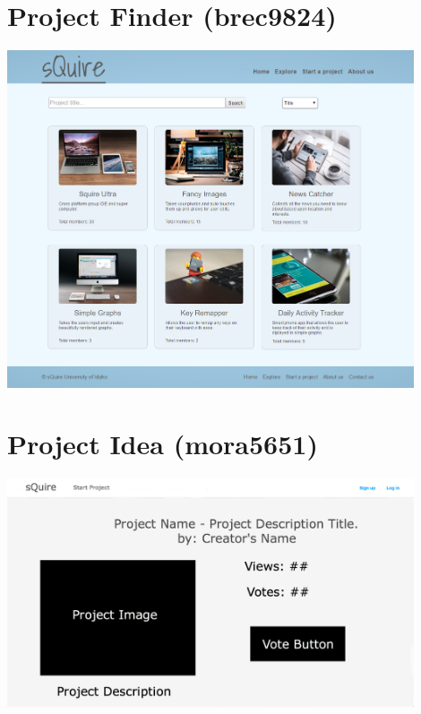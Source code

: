 \documentclass[11pt]{report}
\begin{document}
    \section{Project Finder (brec9824)}
    \begin{minipage}{1\textwidth}
        \begin{center}
            \includegraphics[width=0.9\textwidth]{mockups/mockup-projectfinder-brec9824}
        \end{center}
    \end{minipage}
    
    \section{Project Idea (mora5651)}
    \begin{minipage}{1\textwidth}
        \begin{center}
            \includegraphics[width=0.9\textwidth]{mockups/mockup-ProjectIdea-mora5651}
        \end{center}
    \end{minipage}
    
\end{document}
